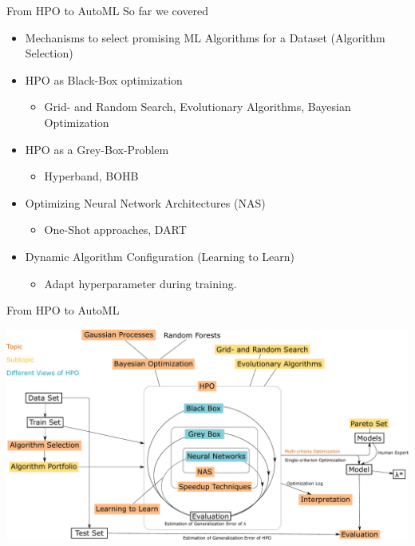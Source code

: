 
\subtitle{Wrap Up}




\maketitle



\begin{frame}{From HPO to AutoML}
  So far we covered
  \begin{itemize}
    \item Mechanisms to select promising ML Algorithms for a Dataset (Algorithm Selection)
    \item HPO as Black-Box optimization
    \begin{itemize}
      \item Grid- and Random Search, Evolutionary Algorithms, Bayesian Optimization
    \end{itemize}
    \item HPO as a Grey-Box-Problem
    \begin{itemize}
      \item Hyperband, BOHB
    \end{itemize}
    \item Optimizing Neural Network Architectures (NAS)
    \begin{itemize}
      \item One-Shot approaches, DART
    \end{itemize}
    \item Dynamic Algorithm Configuration (Learning to Learn)
    \begin{itemize}
      \item Adapt hyperparameter during training. 
    \end{itemize}
  \end{itemize}  
\end{frame}

\begin{frame}{From HPO to AutoML}
    \begin{center}
      \includegraphics[width = 0.9\linewidth]{images/drawing.pdf}  
    \end{center}
\end{frame}

